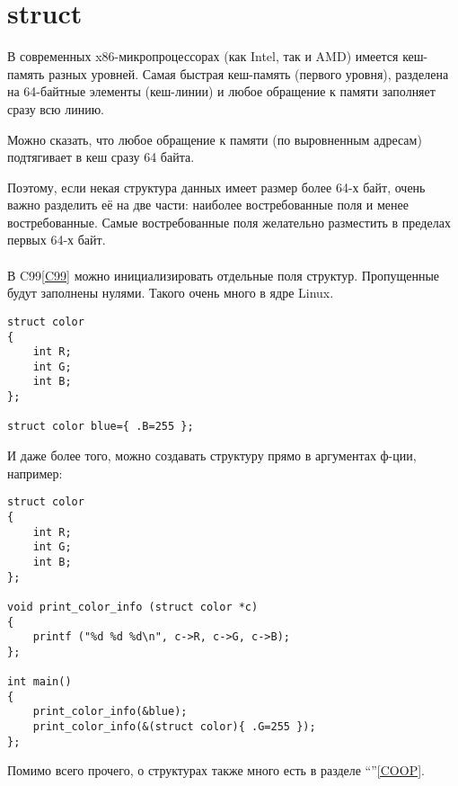 ﻿\section{struct}

В современных x86-микропроцессорах (как Intel, так и AMD) имеется кеш-память разных уровней. 
Самая быстрая кеш-память (первого уровня),
разделена на 64-байтные элементы (кеш-линии) и любое обращение к памяти заполняет сразу всю линию.

Можно сказать, что любое обращение к памяти (по выровненным адресам) подтягивает в кеш сразу 64 байта.

Поэтому, если некая структура данных имеет размер более 64-х байт, очень важно разделить её на две части:
наиболее востребованные поля и менее востребованные. 
Самые востребованные поля желательно разместить в пределах первых 64-х байт. \\
\\
В C99\ref{C99} можно инициализировать отдельные поля структур. Пропущенные будут заполнены нулями. Такого очень
много в ядре Linux. 

\begin{lstlisting}
struct color
{
	int R;
	int G;
	int B;
};

struct color blue={ .B=255 };
\end{lstlisting}


И даже более того, можно создавать структуру прямо в аргументах ф-ции, например:

\begin{lstlisting}
struct color
{
	int R;
	int G;
	int B;
};

void print_color_info (struct color *c)
{
	printf ("%d %d %d\n", c->R, c->G, c->B);
};

int main()
{
	print_color_info(&blue);
	print_color_info(&(struct color){ .G=255 });
};
\end{lstlisting}

Помимо всего прочего, о структурах также много есть в разделе ``\COOPname''\ref{COOP}.

